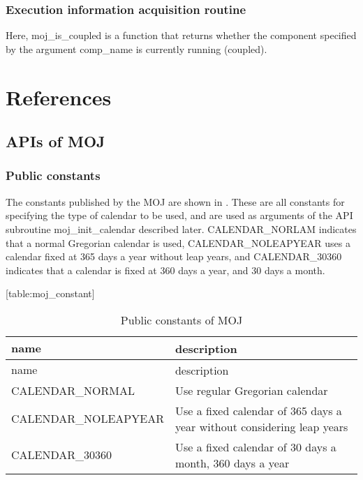 \hypertarget{execution-information-acquisition-routine}{%
\subsubsection{Execution information acquisition
routine}\label{execution-information-acquisition-routine}}

Here, moj\_is\_coupled is a function that returns whether the component
specified by the argument comp\_name is currently running (coupled).

\hypertarget{references}{%
\section{References}\label{references}}

\hypertarget{apis-of-moj}{%
\subsection{APIs of MOJ}\label{apis-of-moj}}

\hypertarget{public-constants}{%
\subsubsection{Public constants}\label{public-constants}}

The constants published by the MOJ are shown in . These are all
constants for specifying the type of calendar to be used, and are used
as arguments of the API subroutine moj\_init\_calendar described later.
CALENDAR\_NORLAM indicates that a normal Gregorian calendar is used,
CALENDAR\_NOLEAPYEAR uses a calendar fixed at 365 days a year without
leap years, and CALENDAR\_30360 indicates that a calendar is fixed at
360 days a year, and 30 days a month.

\protect\hypertarget{table:moj_constant}{}{{[}table:moj\_constant{]}}

\hypertarget{table:moj_constant}{}
\begin{longtable}[]{@{}ll@{}}
\caption{Public constants of MOJ}\tabularnewline
\toprule
name & description　\tabularnewline
\midrule
\endfirsthead
\toprule
name & description　\tabularnewline
\midrule
\endhead
CALENDAR\_NORMAL & Use regular Gregorian calendar\tabularnewline
CALENDAR\_NOLEAPYEAR & Use a fixed calendar of 365 days a year without
considering leap years\tabularnewline
CALENDAR\_30360 & Use a fixed calendar of 30 days a month, 360 days a
year\tabularnewline
\bottomrule
\end{longtable}

